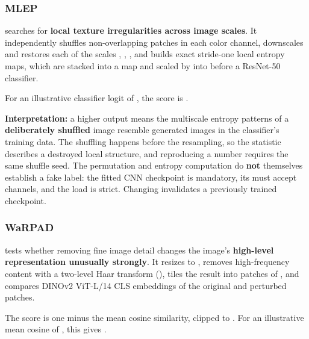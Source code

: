 \subsubsection{MLEP}\label{record-DETECTORS-md-mlep}

\texttt{} searches for \textbf{local texture
irregularities across image scales}. It independently shuffles
non-overlapping \texttt{} patches in each color channel,
downscales and restores each of the scales \texttt{},
\texttt{}, \texttt{}, and builds exact
stride-one \texttt{} local entropy maps, which are
stacked into a \texttt{} map and scaled by
\texttt{} into \texttt{\seqsplit{[0, 1]}} before a ResNet-50
classifier.

For an illustrative classifier logit of \texttt{}, the
score is \texttt{}.

\textbf{Interpretation:} a higher output means the multiscale entropy
patterns of a \textbf{deliberately shuffled} image resemble generated
images in the classifier's training data. The shuffling happens before
the resampling, so the statistic describes a destroyed local structure,
and reproducing a number requires the same shuffle seed. The permutation
and entropy computation do \textbf{not} themselves establish a fake
label: the fitted CNN checkpoint is mandatory, its
\texttt{} must accept
\texttt{} channels, and the load is strict.
Changing \texttt{} invalidates a previously trained
checkpoint.

\subsubsection{WaRPAD}\label{record-DETECTORS-md-warpad}

\texttt{} tests whether removing fine image
detail changes the image's \textbf{high-level representation unusually
strongly}. It resizes to \texttt{}, removes
high-frequency content with a two-level Haar transform
(\texttt{}), tiles the result into
\texttt{} patches of \texttt{},
and compares DINOv2 ViT-L/14 CLS embeddings of the original and
perturbed patches.

The score is one minus the mean cosine similarity, clipped to
\texttt{\seqsplit{[0, 1]}}. For an illustrative mean cosine of
\texttt{}, this gives
\texttt{}.

